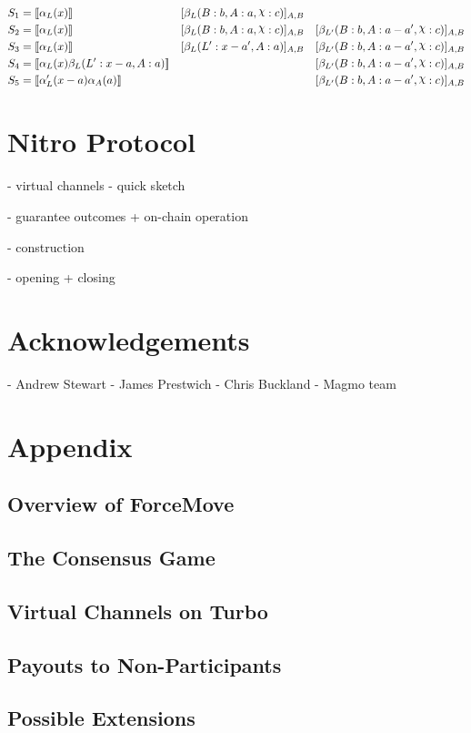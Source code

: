 \documentclass{article}
\DeclareRobustCommand{\rchi}{{\mathpalette\irchi\relax}}
\newcommand{\irchi}[2]{\raisebox{\depth}{$#1\chi$}} %
\theoremstyle{definition}
\newcommand{\adj}[1]{\llbracket #1 \rrbracket}
\newcommand{\enf}[1]{[#1]}
\begin{document}
\begin{align*}
S_1 &= \adj{\alpha_L(x)} &&\enf{\beta_L(B: b, A: a, \rchi: c)}_{A, B} & \\
S_2 &= \adj{\alpha_L(x)} &&\enf{\beta_L(B: b, A: a, \rchi: c)}_{A, B} & \enf{\beta_{L'}(B: b, A: a - a', \rchi: c)}_{A, B}\\
S_3 &= \adj{\alpha_L(x)} &&\enf{\beta_L(L': x-a', A: a)}_{A, B} & \enf{\beta_{L'}(B: b, A: a - a', \rchi: c)}_{A, B}\\
S_4 &= \adj{\alpha_L(x)\beta_L(L': x-a, A: a)} && & \enf{\beta_{L'}(B: b, A: a - a', \rchi: c)}_{A, B}\\
S_5 &= \adj{\alpha_L'(x-a)\alpha_A(a)} && & \enf{\beta_{L'}(B: b, A: a - a', \rchi: c)}_{A, B}\\
\end{align*}

\section{Nitro Protocol}

- virtual channels
- quick sketch

- guarantee outcomes + on-chain operation

- construction

- opening + closing


\section{Acknowledgements}

- Andrew Stewart
- James Prestwich
- Chris Buckland
- Magmo team


\section{Appendix}

\subsection{Overview of ForceMove}
\subsection{The Consensus Game}
\subsection{Virtual Channels on Turbo}
\subsection{Payouts to Non-Participants}
\subsection{Possible Extensions}
\end{document}
